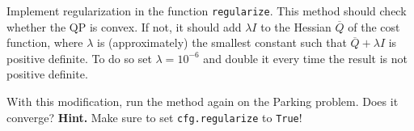 \documentclass[]{article}
\begin{document}
\begin{assignment}
	Implement regularization in the function \texttt{regularize}. This method should 
	check whether the QP is convex. 
	If not, it should add $\lambda I$ to the Hessian $\overline{Q}$ of the cost function, where $\lambda$ is 
	(approximately) the smallest constant such that $\overline{Q} + \lambda I$ is positive definite.
	To do so set $\lambda = 10^{-6}$ and double it every time the result is not positive definite. 
	
	With this modification, run the method again on the Parking problem. Does it converge? 
	\textbf{Hint.}  Make sure to set \texttt{cfg.regularize} to \texttt{True}!
\end{assignment}


 
\end{document}
